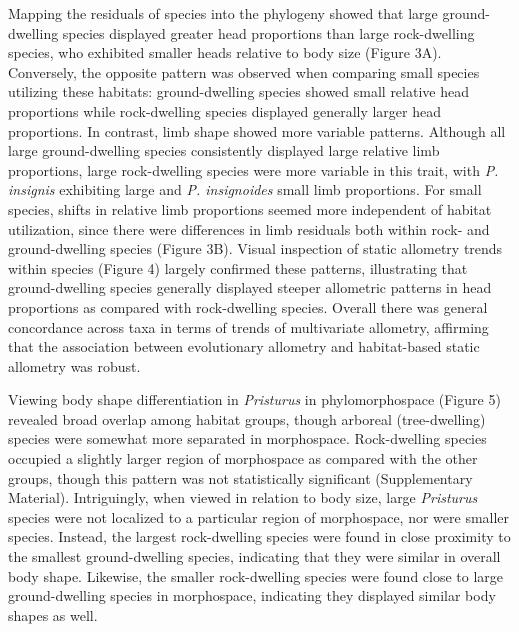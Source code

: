 \documentclass[
  11pt,
]{article}
\begin{document}
Mapping the residuals of species into the phylogeny showed that large
ground-dwelling species displayed greater head proportions than large
rock-dwelling species, who exhibited smaller heads relative to body size
(Figure 3A). Conversely, the opposite pattern was observed when
comparing small species utilizing these habitats: ground-dwelling
species showed small relative head proportions while rock-dwelling
species displayed generally larger head proportions. In contrast, limb
shape showed more variable patterns. Although all large ground-dwelling
species consistently displayed large relative limb proportions, large
rock-dwelling species were more variable in this trait, with \emph{P.
insignis} exhibiting large and \emph{P. insignoides} small limb
proportions. For small species, shifts in relative limb proportions
seemed more independent of habitat utilization, since there were
differences in limb residuals both within rock- and ground-dwelling
species (Figure 3B). Visual inspection of static allometry trends within
species (Figure 4) largely confirmed these patterns, illustrating that
ground-dwelling species generally displayed steeper allometric patterns
in head proportions as compared with rock-dwelling species. Overall
there was general concordance across taxa in terms of trends of
multivariate allometry, affirming that the association between
evolutionary allometry and habitat-based static allometry was robust.
\hfill\break

Viewing body shape differentiation in \emph{Pristurus} in
phylomorphospace (Figure 5) revealed broad overlap among habitat groups,
though arboreal (tree-dwelling) species were somewhat more separated in
morphospace. Rock-dwelling species occupied a slightly larger region of
morphospace as compared with the other groups, though this pattern was
not statistically significant (Supplementary Material). Intriguingly,
when viewed in relation to body size, large \emph{Pristurus} species
were not localized to a particular region of morphospace, nor were
smaller species. Instead, the largest rock-dwelling species were found
in close proximity to the smallest ground-dwelling species, indicating
that they were similar in overall body shape. Likewise, the smaller
rock-dwelling species were found close to large ground-dwelling species
in morphospace, indicating they displayed similar body shapes as well.
\hfill\break
\end{document}

